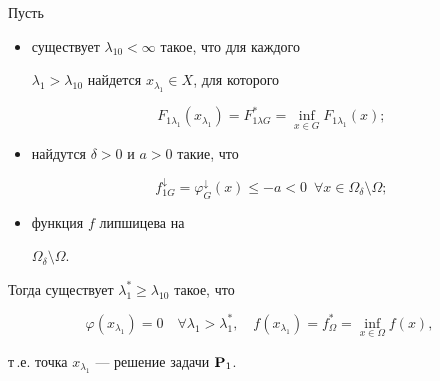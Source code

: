 \begin{thms}\label{t2.1}


Пусть


\begin{itemize}


\item[1)] существует $\lambda_{10} < \infty$ такое, что для каждого


$\lambda_1 > \lambda_{10}$ найдется $x_{\lambda_1}\in X$, для которого


$$




F_{1\lambda_1}(x_{\lambda_1}) = F_{1\lambda G}^{*} = \inf\limits_{x\in


G}F_{1\lambda_1}(x);




$$


\item[2)] найдутся $\delta > 0$ и $a > 0$ такие, что


\begin{equation}\label{e3.4.2e}


f^{\downarrow}_{1G}=\varphi^{\downarrow}_G(x)\leq - a < 0\ \; \forall


x\in \Omega_{\delta}\setminus \Omega;




\end{equation}


\item[3)] функция $f$ липшицева на


$\Omega_{\delta}\setminus \Omega$.


\end{itemize}





Тогда существует $\lambda_1^{*}\geq \lambda_{10}$ такое, что


$$


\varphi(x_{\lambda_1}) = 0\quad \forall \lambda_1 > \lambda_1^{*},\quad


f(x_{\lambda_1}) = f^{*}_{\Omega} = \inf_{x\in \Omega}f(x),


$$


т\,.е. точка $x_{\lambda_1}$ --- решение задачи $\bold P_1$. 


\end{thms}





